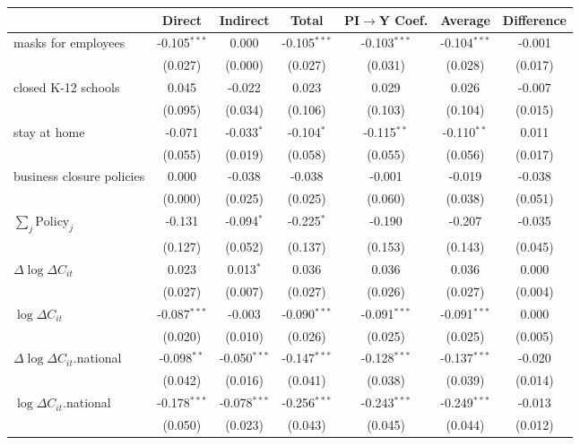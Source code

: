 
\begin{tabular}{lccccc|>{}c}
\toprule
  & Direct & Indirect & Total & PI$\to$Y Coef. & Average & Difference\\
\midrule
masks for employees & -0.105$^{***}$ & 0.000 & -0.105$^{***}$ & -0.103$^{***}$ & -0.104$^{***}$ & -0.001\\
 & (0.027) & (0.000) & (0.027) & (0.031) & (0.028) & (0.017)\\
closed K-12 schools & 0.045 & -0.022 & 0.023 & 0.029 & 0.026 & -0.007\\
 & (0.095) & (0.034) & (0.106) & (0.103) & (0.104) & (0.015)\\
stay at home & -0.071 & -0.033$^{*}$ & -0.104$^{*}$ & -0.115$^{**}$ & -0.110$^{**}$ & 0.011\\
 & (0.055) & (0.019) & (0.058) & (0.055) & (0.056) & (0.017)\\
business closure policies & 0.000 & -0.038 & -0.038 & -0.001 & -0.019 & -0.038\\
 & (0.000) & (0.025) & (0.025) & (0.060) & (0.038) & (0.051)\\
$\sum_j \mathrm{Policy}_j$ & -0.131 & -0.094$^{*}$ & -0.225$^{*}$ & -0.190 & -0.207 & -0.035\\
 & (0.127) & (0.052) & (0.137) & (0.153) & (0.143) & (0.045)\\
$\Delta \log \Delta C_{it}$ & 0.023 & 0.013$^{*}$ & 0.036 & 0.036 & 0.036 & 0.000\\
 & (0.027) & (0.007) & (0.027) & (0.026) & (0.027) & (0.004)\\
$\log \Delta C_{it}$ & -0.087$^{***}$ & -0.003 & -0.090$^{***}$ & -0.091$^{***}$ & -0.091$^{***}$ & 0.000\\
 & (0.020) & (0.010) & (0.026) & (0.025) & (0.025) & (0.005)\\
$\Delta \log \Delta C_{it}$.national & -0.098$^{**}$ & -0.050$^{***}$ & -0.147$^{***}$ & -0.128$^{***}$ & -0.137$^{***}$ & -0.020\\
 & (0.042) & (0.016) & (0.041) & (0.038) & (0.039) & (0.014)\\
$\log \Delta C_{it}$.national & -0.178$^{***}$ & -0.078$^{***}$ & -0.256$^{***}$ & -0.243$^{***}$ & -0.249$^{***}$ & -0.013\\
 & (0.050) & (0.023) & (0.043) & (0.045) & (0.044) & (0.012)\\
\bottomrule
\end{tabular}